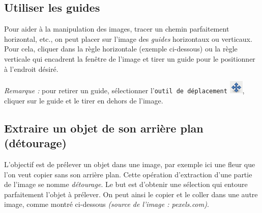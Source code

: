 \begin{enumerate}



\end{enumerate}

\subsection{Utiliser les guides}\label{Gimp3guide} 
Pour aider à la manipulation des images, tracer un chemin parfaitement horizontal, etc., on peut placer sur l'image des \emph{guides} horizontaux ou verticaux. Pour cela, cliquer dans la règle horizontale (exemple ci-dessous) ou la règle verticale qui encadrent la fenêtre de l'image et tirer un guide pour le positionner à l'endroit désiré.

%

\emph{Remarque :} pour retirer un guide, sélectionner l'\texttt{outil de déplacement} \includegraphics[width=.6cm]{./images/image03/iconeDeplace}, cliquer sur le guide et le tirer en dehors de l'image. 

\subsection{Extraire un objet de son arrière plan (détourage)}\label{Gimp3detourage} 

L'objectif est de prélever un objet dans une image, par exemple ici une fleur que l'on veut copier sans son arrière plan. Cette opération d'extraction d'une partie de l'image se nomme \emph{détourage}. Le but est d'obtenir une sélection qui entoure parfaitement l'objet à prélever. On peut ainsi le copier et le coller dans une autre image, comme montré ci-dessous \emph{(source de l'image : pexels.com)}.

